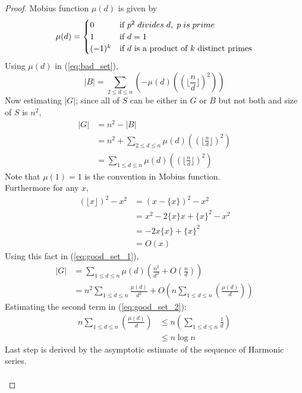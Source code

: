 \begin{proof}
Mobius function $\mu(d)$ is given by
\[
  \mu(d) = 
  \begin{cases}
    0 &\mbox{if } p^2 \hspace{0.1cm}divides \hspace{0.1cm} d, \hspace{0.1cm} p  \hspace{0.1cm} is \hspace{0.1cm} prime\\
    1 &\mbox{if } d = 1\\
    (-1)^k &\mbox{if } d \text{ is a product of }k \text{ distinct primes} 
  \end{cases}
\]
Using $\mu(d)$ in (\ref{eq:bad_set}),
$$|B| = \sum_{2 \le d \le n}(-\mu(d) ((\lfloor \frac{n}{d} \rfloor)^2))$$
Now estimating $|G|$; since all of $S$ can be either in $G$ or $B$ but not both and size of $S$ is $n^2$,
\begin{align}
|G| &= n^2 - |B|\nonumber \\
&= n^2 + \sum_{2 \le d \le n}\mu(d) ((\lfloor \frac{n}{d} \rfloor)^2)\nonumber \\
&= \sum_{1 \le d \le n}\mu(d) ((\lfloor \frac{n}{d} \rfloor)^2) \label{eq:good_set_1}
\end{align}
Note that $\mu(1) = 1$ is the convention in Mobius function.\\
 Furthermore for any $x$,
\begin{align*}
(\lfloor x \rfloor )^2 - x^2 &= (x-\{x\})^2 - x^2\\
&= x^2 - 2\{x\}x + \{x\}^2 -x^2\\
&= -2x\{x\} + \{x\}^2\\
&= O(x)
\end{align*}
Using this fact in (\ref{eq:good_set_1}),
\begin{align}
|G| &= \sum_{1 \le d \le n}\mu(d) (\frac{n^2}{d^2} + O(\frac{n}{d}))\nonumber \\
&= n^2 \sum_{1 \le d \le n}\frac{\mu(d)}{d^2} +  O(n \sum_{1 \le d \le n}(\frac{\mu(d)}{d})) \label{eq:good_set_2}
\end{align}
Estimating the second term in (\ref{eq:good_set_2}): 
\begin{align}
n \sum_{1 \le d \le n}(\frac{\mu(d)}{d}) &\le n (\sum_{1 \le d \le n}\frac{1}{d})\nonumber \\
&\le n \log{n} \label{eq:term_2_in_good_set}
\end{align}
Last step is derived by the asymptotic estimate of the sequence of Harmonic series. \\ \\

\end{proof}
